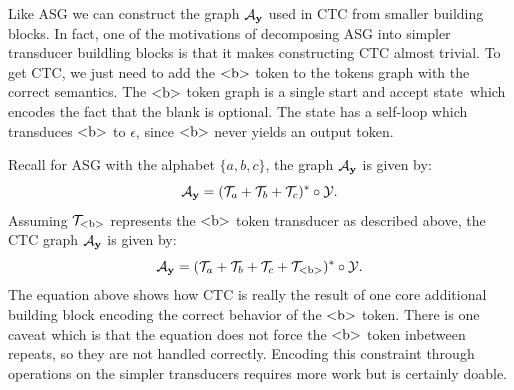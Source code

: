 Like ASG we can construct the graph $\mathcal{A}_{\bf y}$ used in CTC from smaller building
blocks. In fact, one of the motivations of decomposing ASG into simpler
transducer buildling blocks is that it makes constructing CTC almost trivial.
To get CTC, we just need to add the $\textrm{<b>}$ token to the tokens graph with the
correct semantics. The $\textrm{<b>}$ token graph is a single start and accept
state which encodes the fact that the blank is optional. The state has a
self-loop which transduces $\textrm{<b>}$ to $\epsilon$, since $\textrm{<b>}$ never yields
an output token.

Recall for ASG with the alphabet $\{a, b, c\}$, the graph $\mathcal{A}_{\bf y}$ is given
by:
$$
\mathcal{A}_{\bf y} = (\mathcal{T}_a + \mathcal{T}_b + \mathcal{T}_c)^* \circ \mathcal{Y}.
$$
Assuming $\mathcal{T}_{\textrm{<b>}}$ represents the $\textrm{<b>}$ token transducer as described
above, the CTC graph $\mathcal{A}_{\bf y}$ is given by:
$$
\mathcal{A}_{\bf y} = (\mathcal{T}_a + \mathcal{T}_b + \mathcal{T}_c + \mathcal{T}_{\textrm{<b>}})^* \circ \mathcal{Y}.
$$
The equation above shows how CTC is really the result of one core additional
building block encoding the correct behavior of the $\textrm{<b>}$ token. There is
one caveat which is that the equation does not force the $\textrm{<b>}$ token
inbetween repeats, so they are not handled correctly. Encoding this constraint
through operations on the simpler transducers requires more work but is
certainly doable.
